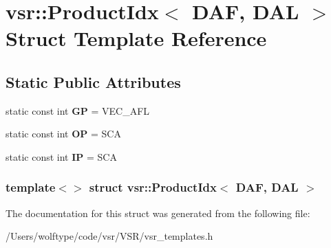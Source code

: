 \hypertarget{structvsr_1_1_product_idx_3_01_d_a_f_00_01_d_a_l_01_4}{\section{vsr\-:\-:Product\-Idx$<$ D\-A\-F, D\-A\-L $>$ Struct Template Reference}
\label{structvsr_1_1_product_idx_3_01_d_a_f_00_01_d_a_l_01_4}
}
\subsection*{Static Public Attributes}
\begin{DoxyCompactItemize}
\item 
\hypertarget{structvsr_1_1_product_idx_3_01_d_a_f_00_01_d_a_l_01_4_a07ffd75549bfac8ed3afa32498b94a76}{static const int {\bfseries G\-P} = V\-E\-C\-\_\-\-A\-F\-L}\label{structvsr_1_1_product_idx_3_01_d_a_f_00_01_d_a_l_01_4_a07ffd75549bfac8ed3afa32498b94a76}

\item 
\hypertarget{structvsr_1_1_product_idx_3_01_d_a_f_00_01_d_a_l_01_4_a561f05d5d84a8220078b968242401dcd}{static const int {\bfseries O\-P} = S\-C\-A}\label{structvsr_1_1_product_idx_3_01_d_a_f_00_01_d_a_l_01_4_a561f05d5d84a8220078b968242401dcd}

\item 
\hypertarget{structvsr_1_1_product_idx_3_01_d_a_f_00_01_d_a_l_01_4_af93a79cf0ec5d4d9864535addc41fd47}{static const int {\bfseries I\-P} = S\-C\-A}\label{structvsr_1_1_product_idx_3_01_d_a_f_00_01_d_a_l_01_4_af93a79cf0ec5d4d9864535addc41fd47}

\end{DoxyCompactItemize}
\subsubsection*{template$<$$>$ struct vsr\-::\-Product\-Idx$<$ D\-A\-F, D\-A\-L $>$}



The documentation for this struct was generated from the following file\-:\begin{DoxyCompactItemize}
\item 
/\-Users/wolftype/code/vsr/\-V\-S\-R/vsr\-\_\-templates.\-h\end{DoxyCompactItemize}
